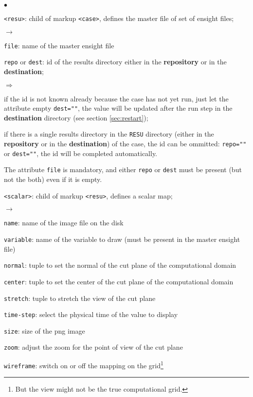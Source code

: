 \documentclass[a4paper,10pt,twoside]{csshortdoc}
\begin{document}
\begin{list}{$\bullet$}{}
\item \texttt{<resu>}: child of markup \texttt{<case>}, defines the master file
of set of ensight files;
\begin{list}{$\rightarrow$}{}
\item \texttt{file}: name of the master ensight file
\item \texttt{repo} or \texttt{dest}: id of the results directory either in the
\textbf{repository} or in the \textbf{destination};
\begin{list}{$\Rightarrow$}{}
\item if the id is not known already because the case has not yet run, just let
the attribute empty \texttt{dest=""}, the value will be updated after the run
step in the \textbf{destination} directory (see section \ref{sec:restart});
\item if there is a single results directory in the \texttt{RESU} directory
(either in the \textbf{repository} or in the \textbf{destination}) of the case,
the id can be ommitted: \texttt{repo=""} or \texttt{dest=""}, the id will be
completed automatically.
\end{list}
\end{list}
The attribute \texttt{file} is mandatory, and either \texttt{repo} or
\texttt{dest} must be present (but not the both) even if it is empty.

\item \texttt{<scalar>}: child of markup \texttt{<resu>}, defines a scalar map;
\begin{list}{$\rightarrow$}{}
\item \texttt{name}: name of the image file on the disk
\item \texttt{variable}: name of the variable to draw (must be present in the master ensight file)
\item \texttt{normal}: tuple to set the normal of the cut plane of the computational domain
\item \texttt{center}: tuple to set the center of the cut plane of the computational domain
\item \texttt{stretch}: tuple to stretch the view of the cut plane
\item \texttt{time-step}: select the physical time of the value to display
\item \texttt{size}: size of the png image
\item \texttt{zoom}: adjust the zoom for the point of view of the cut plane
\item \texttt{wireframe}: switch on or off the mapping on the grid\footnote{But the view might not be the true computational grid.}
\end{list}


\end{list}
\end{document}
